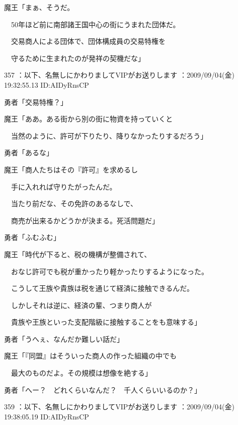 \documentclass[a4j,twocolumn]{tarticle}
\begin{document}
魔王「まぁ、そうだ。\par{} 
　50年ほど前に南部諸王国中心の街にうまれた団体だ。\par{} 
　交易商人による団体で、団体構成員の交易特権を\par{} 
　守るために生まれたのが発祥の契機だな」 

	
    
    

357 ：以下、名無しにかわりましてVIPがお送りします ：2009/09/04(金) 19:32:55.13 ID:AIDyRnsCP 


勇者「交易特権？」 



魔王「ああ。ある街から別の街に物資を持っていくと\par{} 
　当然のように、許可が下りたり、降りなかったりするだろう」\par{} 
勇者「あるな」 



魔王「商人たちはその『許可』を求めるし\par{} 
　手に入れれば守りたがったんだ。\par{} 
　当たり前だな、その免許のあるなしで、\par{} 
　商売が出来るかどうかが決まる。死活問題だ」 



勇者「ふむふむ」 



魔王「時代が下ると、税の機構が整備されて、\par{} 
　おなじ許可でも税が重かったり軽かったりするようになった。\par{} 
　こうして王族や貴族は税を通じて経済に接触できるんだ。\par{} 
　しかしそれは逆に、経済の輩、つまり商人が\par{} 
　貴族や王族といった支配階級に接触することをも意味する」 



勇者「うへぇ、なんだか難しい話だ」 



魔王「『同盟』はそういった商人の作った組織の中でも\par{} 
　最大のものだよ。その規模は想像を絶する」 



勇者「へー？　どれくらいなんだ？　千人くらいいるのか？」 

	
    
    

359 ：以下、名無しにかわりましてVIPがお送りします ：2009/09/04(金) 19:38:05.19 ID:AIDyRnsCP 
\end{document}
